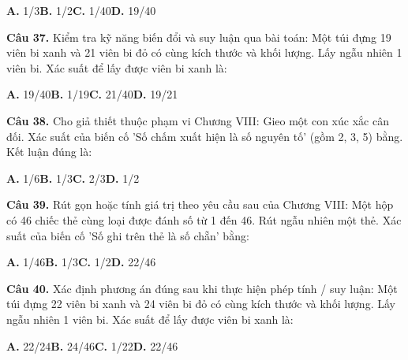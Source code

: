 \documentclass[11pt,a4paper]{article}
\begin{document}
\hspace*{1.5em}\textbf{A.} 1/3\quad\quad \textbf{B.} 1/2\quad\quad \textbf{C.} 1/40\quad\quad \textbf{D.} 19/40\par\vspace{2pt}
\textbf{\color{primary} Câu 37.} Kiểm tra kỹ năng biến đổi và suy luận qua bài toán: Một túi đựng 19 viên bi xanh và 21 viên bi đỏ có cùng kích thước và khối lượng. Lấy ngẫu nhiên 1 viên bi. Xác suất để lấy được viên bi xanh là:\par
\hspace*{1.5em}\textbf{A.} 19/40\quad\quad \textbf{B.} 1/19\quad\quad \textbf{C.} 21/40\quad\quad \textbf{D.} 19/21\par\vspace{2pt}
\textbf{\color{primary} Câu 38.} Cho giả thiết thuộc phạm vi Chương VIII: Gieo một con xúc xắc cân đối. Xác suất của biến cố 'Số chấm xuất hiện là số nguyên tố' (gồm 2, 3, 5) bằng. Kết luận đúng là:\par
\hspace*{1.5em}\textbf{A.} 1/6\quad\quad \textbf{B.} 1/3\quad\quad \textbf{C.} 2/3\quad\quad \textbf{D.} 1/2\par\vspace{2pt}
\textbf{\color{primary} Câu 39.} Rút gọn hoặc tính giá trị theo yêu cầu sau của Chương VIII: Một hộp có 46 chiếc thẻ cùng loại được đánh số từ 1 đến 46. Rút ngẫu nhiên một thẻ. Xác suất của biến cố 'Số ghi trên thẻ là số chẵn' bằng:\par
\hspace*{1.5em}\textbf{A.} 1/46\quad\quad \textbf{B.} 1/3\quad\quad \textbf{C.} 1/2\quad\quad \textbf{D.} 22/46\par\vspace{2pt}
\textbf{\color{primary} Câu 40.} Xác định phương án đúng sau khi thực hiện phép tính / suy luận: Một túi đựng 22 viên bi xanh và 24 viên bi đỏ có cùng kích thước và khối lượng. Lấy ngẫu nhiên 1 viên bi. Xác suất để lấy được viên bi xanh là:\par
\hspace*{1.5em}\textbf{A.} 22/24\quad\quad \textbf{B.} 24/46\quad\quad \textbf{C.} 1/22\quad\quad \textbf{D.} 22/46\par\vspace{2pt}
\end{document}
